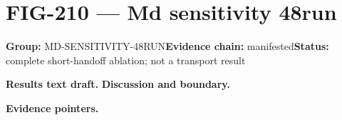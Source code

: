 \clearpage
\section{FIG-210 --- Md sensitivity 48run}
\label{figpage:fig-210}
\textbf{Group:} MD-SENSITIVITY-48RUN\quad \textbf{Evidence chain:} manifested\quad \textbf{Status:} complete short-handoff ablation; not a transport result

\textbf{Results text draft.} 
\textbf{Discussion and boundary.} 


\textbf{Evidence pointers.}



\vfill
